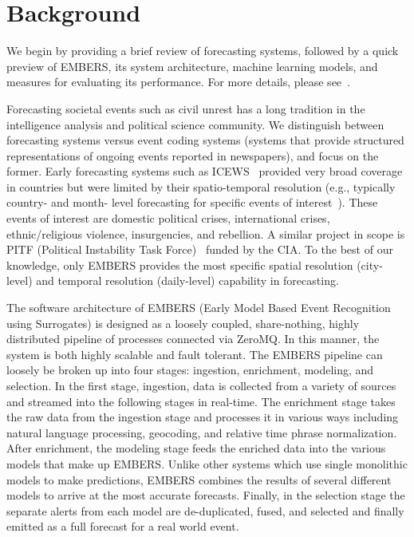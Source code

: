 \section{Background}
\label{sec:background}
We begin by providing a brief review of forecasting systems, followed by a
quick preview of EMBERS, its system architecture, machine learning models,
and measures for evaluating its performance. For more details, please
see~\cite{kdd:beating-the-news}.

Forecasting societal events such as civil unrest has a long tradition in the intelligence analysis and political science
community. We distinguish between forecasting systems versus event coding
systems (systems that provide
structured representations of ongoing events reported in newspapers), and focus on the former.
Early forecasting systems such as ICEWS~\cite{icews} provided very broad coverage in countries but
were limited by their spatio-temporal resolution (e.g., typically country- and month- level forecasting for
specific events of interest~\cite{eoiprediction}). These events of interest are
domestic political crises, international crises, ethnic/religious violence, insurgencies,
and rebellion.
A similar project in scope is PITF (Political Instability
Task Force)~\cite{pitf} funded by the CIA.
To the best of our knowledge, only EMBERS provides
the most specific spatial resolution (city-level) and temporal resolution (daily-level) capability in forecasting.

The software architecture of EMBERS (Early Model Based Event Recognition using
Surrogates) is designed as a loosely coupled, share-nothing, highly distributed pipeline of
processes connected via ZeroMQ.  In this manner, the system is both highly scalable and fault
tolerant.  The EMBERS pipeline can loosely be broken up into four stages:
ingestion, enrichment, modeling, and selection.  In the first stage, ingestion,
data is collected from a variety of sources and streamed into the following
stages in real-time.  The enrichment stage takes the raw data from the ingestion stage
and processes it in various ways including natural language processing,
geocoding, and relative time phrase normalization.  After enrichment, the
modeling stage feeds the enriched data into the various models that make up
EMBERS.  Unlike other systems which use single monolithic models to make
predictions, EMBERS combines the results of several different models to arrive
at the most accurate forecasts.  Finally, in the selection stage the separate
alerts from each model are de-duplicated, fused, and selected and finally
emitted as a full forecast for a real world event.

